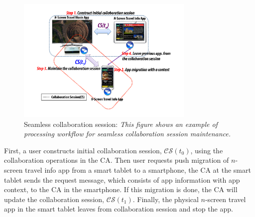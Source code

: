 \documentclass[conference]{IEEEtran}
\begin{document}
%
    \begin{figure}[htb] %
    \centering
    \includegraphics[width=8.5cm,keepaspectratio]{seamless}
    \caption{Seamless collaboration session: \emph{This figure shows an example of processing workflow for seamless collaboration session maintenance.}}
    \label{fig:pushmigration}
    \end{figure}

First, a user constructs initial collaboration session, $\mathcal{CS}(t_0)$, using the collaboration operations in the CA.
Then user requests push migration of $n$-screen travel info app from a smart tablet to a smartphone, the CA at the smart tablet sends the request message, which consists of app information with app context, to the CA in the smartphone. If this migration is done, the CA will update the collaboration session, $\mathcal{CS}(t_1)$. Finally, the physical $n$-screen travel app in the smart tablet leaves from collaboration session and stop the app. 
\end{document}
